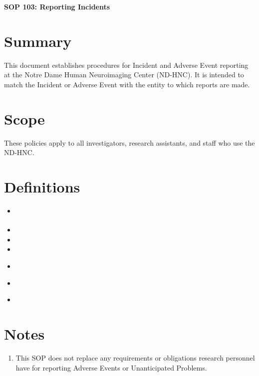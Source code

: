 \documentclass[11pt]{article}
\begin{document}
\renewcommand{\labelenumii}{\arabic{enumi}.\arabic{enumii}}
\renewcommand{\labelenumiii}{\arabic{enumi}.\arabic{enumii}.\arabic{enumiii}}
\renewcommand{\labelenumiv}{\arabic{enumi}.\arabic{enumii}.\arabic{enumiii}.\arabic{enumiv}}

\begin{center}
	\textbf{\Large SOP 103: Reporting Incidents}\\
	\hrulefill
\end{center}


\section{Summary}
This document establishes procedures for Incident and Adverse Event reporting at the Notre Dame Human Neuroimaging Center (ND-HNC). It is intended to match the Incident or Adverse Event with the entity to which reports are made.


\section{Scope}
These policies apply to all investigators, research assistants, and staff who use the ND-HNC.

\section{Definitions}

\begin{itemize}
	\item \AdverseEvent\cite{ohrp2007}
	\item \GoodCatch
	\item \Incident
	\item \NearMiss
	\item \SeriousInjury\cite{injury}
	\item \UnanticipatedProblem\cite{ohrp2007}
	\item \Visitor
\end{itemize}

\section{Notes}

\begin{enumerate}
	\item This SOP does not replace any requirements or obligations research personnel have for reporting Adverse Events or Unanticipated Problems.
\end{enumerate}
\end{document}
